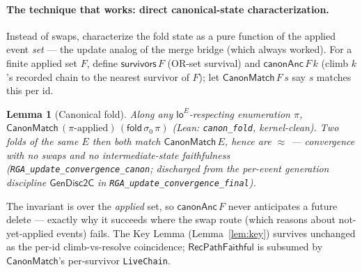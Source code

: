 \documentclass[11pt]{article}
\newtheorem{lemma}{Lemma}
\theoremstyle{definition}
\theoremstyle{remark}
\newcommand{\st}{\sigma}
\newcommand{\ini}{\st_0}
\newcommand{\eqobs}{\approx}
\newcommand{\loE}{\mathsf{lo}^{E}}
\newcommand{\fold}{\mathsf{fold}}
\newcommand{\RVF}{\textsf{RecPathFaithful}}
\newcommand{\lean}[1]{\texttt{#1}}
\begin{document}
\paragraph{The technique that works: direct canonical-state characterization.} Instead of swaps,
characterize the fold state as a pure function of the applied event \emph{set} --- the update
analog of the merge bridge (which always worked). For a finite applied set $F$, define
$\mathsf{survivors}\,F$ (OR-set survival) and $\mathsf{canonAnc}\,F\,k$ (climb $k$'s recorded chain
to the nearest survivor of $F$); let $\mathsf{CanonMatch}\,F\,s$ say $s$ matches this per id.
\begin{lemma}[Canonical fold]\label{lem:canon}
Along any $\loE$-respecting enumeration $\pi$, $\mathsf{CanonMatch}\,(\pi\text{-applied})\,
(\fold\,\ini\,\pi)$ (Lean: \lean{canon\_fold}, kernel-clean). Two folds of the same $E$ then both
match $\mathsf{CanonMatch}\,E$, hence are $\eqobs$ --- convergence with no swaps and no
intermediate-state faithfulness (\lean{RGA\_update\_convergence\_canon}; discharged from the
per-event generation discipline $\mathsf{GenDisc2C}$ in \lean{RGA\_update\_convergence\_final}).
\end{lemma}
The invariant is over the \emph{applied} set, so $\mathsf{canonAnc}\,F$ never anticipates a future
delete --- exactly why it succeeds where the swap route (which reasons about not-yet-applied
events) fails. The Key Lemma (Lemma~\ref{lem:key}) survives unchanged as the per-id climb-vs-resolve
coincidence; $\RVF$ is subsumed by $\mathsf{CanonMatch}$'s per-survivor \lean{LiveChain}.
\end{document}

